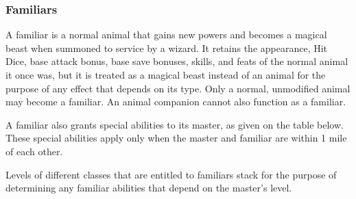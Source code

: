\subsubsection{Familiars}
A familiar is a normal animal that gains new powers and becomes a magical beast when summoned to service by a wizard. It retains the appearance, Hit Dice, base attack bonus, base save bonuses, skills, and feats of the normal animal it once was, but it is treated as a magical beast instead of an animal for the purpose of any effect that depends on its type. Only a normal, unmodified animal may become a familiar. An animal companion cannot also function as a familiar.

A familiar also grants special abilities to its master, as given on the table below. These special abilities apply only when the master and familiar are within 1 mile of each other.

Levels of different classes that are entitled to familiars stack for the purpose of determining any familiar abilities that depend on the master's level.



